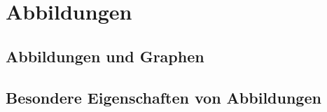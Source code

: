 \section{Abbildungen}

\subsection{Abbildungen und Graphen}

\subsection{Besondere Eigenschaften von Abbildungen}

